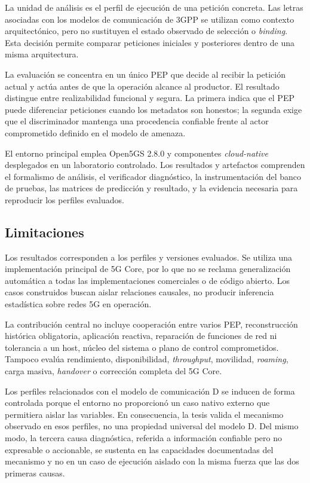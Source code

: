 La unidad de análisis es el perfil de ejecución de una petición concreta. Las letras asociadas con los modelos de comunicación de 3GPP se utilizan como contexto arquitectónico, pero no sustituyen el estado observado de selección o \textit{binding}. Esta decisión permite comparar peticiones iniciales y posteriores dentro de una misma arquitectura.

La evaluación se concentra en un único PEP que decide al recibir la petición actual y actúa antes de que la operación alcance al productor. El resultado distingue entre realizabilidad funcional y segura. La primera indica que el PEP puede diferenciar peticiones cuando los metadatos son honestos; la segunda exige que el discriminador mantenga una procedencia confiable frente al actor comprometido definido en el modelo de amenaza.

El entorno principal emplea Open5GS 2.8.0 y componentes \textit{cloud-native} desplegados en un laboratorio controlado. Los resultados y artefactos comprenden el formalismo de análisis, el verificador diagnóstico, la instrumentación del banco de pruebas, las matrices de predicción y resultado, y la evidencia necesaria para reproducir los perfiles evaluados.

\subsection{Limitaciones}

Los resultados corresponden a los perfiles y versiones evaluados. Se utiliza una implementación principal de 5G Core, por lo que no se reclama generalización automática a todas las implementaciones comerciales o de código abierto. Los casos construidos buscan aislar relaciones causales, no producir inferencia estadística sobre redes 5G en operación.

La contribución central no incluye cooperación entre varios PEP, reconstrucción histórica obligatoria, aplicación reactiva, reparación de funciones de red ni tolerancia a un host, núcleo del sistema o plano de control comprometidos. Tampoco evalúa rendimiento, disponibilidad, \textit{throughput}, movilidad, \textit{roaming}, carga masiva, \textit{handover} o corrección completa del 5G Core.

Los perfiles relacionados con el modelo de comunicación D se inducen de forma controlada porque el entorno no proporcionó un caso nativo externo que permitiera aislar las variables. En consecuencia, la tesis valida el mecanismo observado en esos perfiles, no una propiedad universal del modelo D. Del mismo modo, la tercera causa diagnóstica, referida a información confiable pero no expresable o accionable, se sustenta en las capacidades documentadas del mecanismo y no en un caso de ejecución aislado con la misma fuerza que las dos primeras causas.

